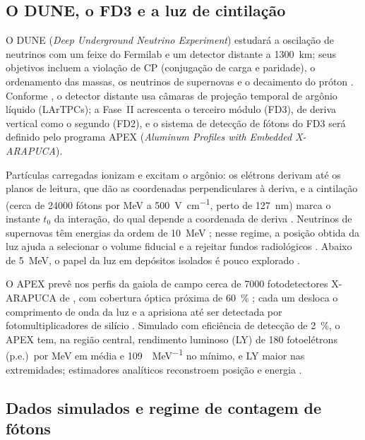 \label{sec:problema}

\subsection{O DUNE, o FD3 e a luz de cintilação}
\label{sec:detector}

O DUNE (\textit{Deep Underground Neutrino Experiment}) estudará a oscilação de neutrinos com um feixe do Fermilab e um detector distante a \qty{1300}{\km}; seus objetivos incluem a violação de CP (conjugação de carga e paridade), o ordenamento das massas, os neutrinos de supernovas e o decaimento do próton \cite{abi2020volume}. Conforme , o detector distante usa câmaras de projeção temporal de argônio líquido (LArTPCs); a Fase~II acrescenta o terceiro módulo (FD3), de deriva vertical como o segundo (FD2), e o sistema de detecção de fótons do FD3 será definido pelo programa APEX (\textit{Aluminum Profiles with Embedded X-ARAPUCA}).

Partículas carregadas ionizam e excitam o argônio: os elétrons derivam até os planos de leitura, que dão as coordenadas perpendiculares à deriva, e a cintilação (cerca de \num{24000} fótons por MeV a \qty{500}{\V\per\cm}, perto de \qty{127}{\nm}) marca o instante $t_0$ da interação, do qual depende a coordenada de deriva \cite{abi2020volume}. Neutrinos de supernovas têm energias da ordem de \qty{10}{\MeV} \cite{abi2021supernova}; nesse regime, a posição obtida da luz ajuda a selecionar o volume fiducial e a rejeitar fundos radiológicos \cite{paulucci2022dune}. Abaixo de \qty{5}{\MeV}, o papel da luz em depósitos isolados é pouco explorado \cite{caratelli2022low}.

O APEX prevê nos perfis da gaiola de campo cerca de \num{7000} fotodetectores X-ARAPUCA de , com cobertura óptica próxima de \qty{60}{\percent} \cite{marinho2025apex}; cada um desloca o comprimento de onda da luz e a aprisiona até ser detectada por fotomultiplicadores de silício \cite{machado2018xarapuca}. Simulado com eficiência de detecção de \qty{2}{\percent}, o APEX tem, na região central, rendimento luminoso (LY) de \num{180} fotoelétrons (p.e.)\ por MeV em média e \qty{109}{\pe\per\MeV} no mínimo, e LY maior nas extremidades; estimadores analíticos reconstroem posição e energia \cite{marinho2025apex}.

\subsection{Dados simulados e regime de contagem de fótons}
\label{sec:dados}

